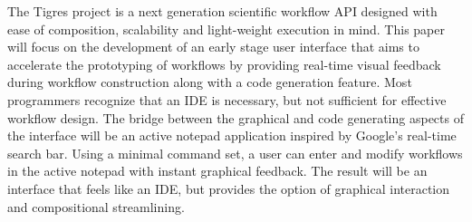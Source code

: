 

The Tigres project is a next generation scientific workflow API designed with ease of composition, scalability and light-weight execution in mind. This paper will focus on the development of an early stage user interface that aims to accelerate the prototyping of workflows by providing real-time visual feedback during workflow construction along with a code generation feature. Most programmers recognize that an IDE is necessary, but not sufficient for effective workflow design. The bridge between the graphical and code generating aspects of the interface will be an active notepad application inspired by Google's real-time search bar. Using a minimal command set, a user can enter and modify workflows in the active notepad with instant graphical feedback. The result will be an interface that feels like an IDE, but provides the option of graphical interaction and compositional streamlining. 
